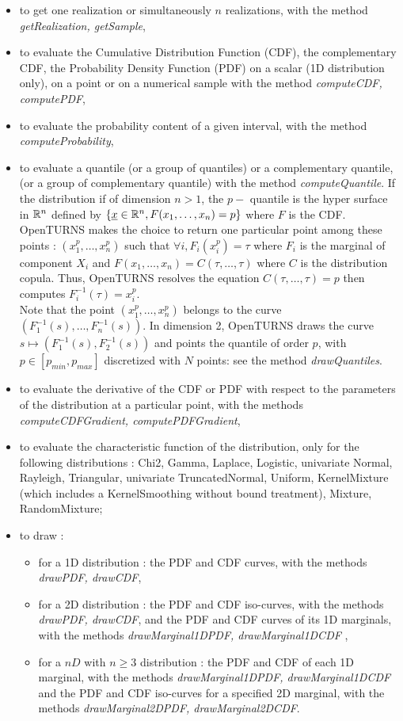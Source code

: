 \begin{itemize}
\item to get one realization or simultaneously $n$ realizations, with the method {\itshape getRealization, getSample},
\item to evaluate the Cumulative Distribution Function (CDF), the complementary CDF, the Probability Density Function (PDF) on a scalar (1D distribution only), on a point or on a numerical sample with the method {\itshape computeCDF, computePDF},
\item to evaluate the probability content of a given interval, with the method {\itshape computeProbability},
\item to evaluate a quantile (or a group of quantiles) or a complementary quantile, (or a group of complementary quantile) with the method {\itshape computeQuantile}. If the distribution if of dimension $n>1$, the $p-$ quantile is the hyper surface in ${\mathbb R}^n$ defined by  $\{{\underline{x}}\in {\mathbb R}^n, F(x_1, \dots, x_n) = p \}$ where $F$ is the CDF. OpenTURNS makes the choice to return one particular point among these points : $(x_1^p, \dots, x_n^p)$ such that $\forall i, F_i(x_i^p) =  \tau$ where $F_i$ is the marginal of component $X_i$ and $F(x_1, \dots, x_n) = C(\tau, \dots, \tau)$ where $C$ is the distribution copula. Thus, OpenTURNS resolves the equation $ C(\tau, \dots, \tau)=p$ then computes $F_i^{-1}(\tau) = x_i^p$.\\
  Note that the point  $(x_1^p, \dots, x_n^p)$ belongs to the curve $(F_1^{-1}(s), \dots, F_n^{-1}(s))$. In dimension 2, OpenTURNS draws the curve $s \mapsto (F_1^{-1}(s), F_2^{-1}(s))$ and points the quantile of order $p$, with $p\in [p_{min}, p_{max}]$ discretized with $N$ points: see the method {\itshape drawQuantiles}.
\item to evaluate the derivative of the CDF or PDF with respect to the parameters of the distribution at a particular point, with the methods {\itshape computeCDFGradient, computePDFGradient},
\item to evaluate the characteristic function of the distribution, only for the following distributions : Chi2, Gamma, Laplace, Logistic, univariate Normal, Rayleigh, Triangular, univariate TruncatedNormal, Uniform, KernelMixture (which includes a KernelSmoothing without bound treatment), Mixture, RandomMixture;
\item to draw :
  \begin{itemize}
  \item for a 1D distribution : the PDF and CDF curves, with the methods {\itshape drawPDF, drawCDF},
  \item for a 2D distribution : the PDF and CDF iso-curves, with the methods {\itshape drawPDF, drawCDF}, and the PDF and CDF curves of its 1D marginals, with the methods {\itshape drawMarginal1DPDF, drawMarginal1DCDF} ,
  \item for a $nD$ with $n\geq 3$ distribution : the PDF and CDF of each 1D marginal, with the methods {\itshape drawMarginal1DPDF, drawMarginal1DCDF} and the PDF and CDF iso-curves for a specified 2D marginal, with the methods {\itshape drawMarginal2DPDF, drawMarginal2DCDF}.
  \end{itemize}
\end{itemize}

